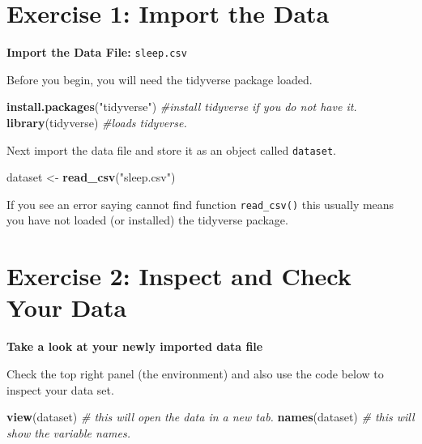 \documentclass[
]{book}
\newenvironment{Shaded}{\begin{snugshade}}{\end{snugshade}}
\newcommand{\CommentTok}[1]{\textcolor[rgb]{0.56,0.35,0.01}{\textit{#1}}}
\newcommand{\FunctionTok}[1]{\textcolor[rgb]{0.13,0.29,0.53}{\textbf{#1}}}
\newcommand{\NormalTok}[1]{#1}
\newcommand{\OtherTok}[1]{\textcolor[rgb]{0.56,0.35,0.01}{#1}}
\newcommand{\StringTok}[1]{\textcolor[rgb]{0.31,0.60,0.02}{#1}}
\let\oldsection\section
\renewcommand{\section}{\needspace{5\baselineskip}\oldsection}
\begin{document}
\section{Exercise 1: Import the Data}\label{exercise-1-import-the-data-1}

\textbf{Import the Data File:} \texttt{sleep.csv}

Before you begin, you will need the tidyverse package loaded.

\begin{Shaded}
\begin{Highlighting}[]
\FunctionTok{install.packages}\NormalTok{(}\StringTok{"tidyverse"}\NormalTok{) }\CommentTok{\#install tidyverse if you do not have it.}
\FunctionTok{library}\NormalTok{(tidyverse) }\CommentTok{\#loads tidyverse.}
\end{Highlighting}
\end{Shaded}

Next import the data file and store it as an object called \texttt{dataset}.

\begin{Shaded}
\begin{Highlighting}[]
\NormalTok{dataset }\OtherTok{\textless{}{-}} \FunctionTok{read\_csv}\NormalTok{(}\StringTok{"sleep.csv"}\NormalTok{)}
\end{Highlighting}
\end{Shaded}

If you see an error saying cannot find function \texttt{read\_csv()} this usually means you have not loaded (or installed) the tidyverse package.

\section{Exercise 2: Inspect and Check Your Data}\label{exercise-2-inspect-and-check-your-data-1}

\textbf{Take a look at your newly imported data file}

Check the top right panel (the environment) and also use the code below to inspect your data set.

\begin{Shaded}
\begin{Highlighting}[]
\FunctionTok{view}\NormalTok{(dataset) }\CommentTok{\# this will open the data in a new tab.}
\FunctionTok{names}\NormalTok{(dataset) }\CommentTok{\# this will show the variable names.}
\end{Highlighting}
\end{Shaded}
\end{document}
